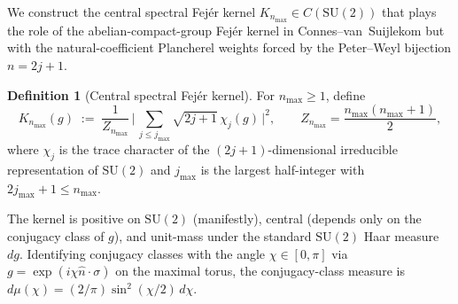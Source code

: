 \documentclass[11pt,a4paper]{article}
\theoremstyle{plain}
\theoremstyle{definition}
\newtheorem{definition}[theorem]{Definition}
\newcommand{\nmax}{n_{\max}}
\newcommand{\SU}{\mathrm{SU}}
\newcommand{\KS}{K}
\begin{document}
We construct the central spectral Fej\'er kernel
$\KS_{\nmax} \in C(\SU(2))$ that plays the role of the
abelian-compact-group Fej\'er kernel in Connes--van~Suijlekom
\cite[\S 3]{connes_vs2021} but with the natural-coefficient Plancherel
weights forced by the Peter--Weyl bijection $n = 2j + 1$.

\begin{definition}[Central spectral Fej\'er kernel]\label{def:central_fejer}
For $\nmax \ge 1$, define
\begin{equation}\label{eq:K_def}
   \KS_{\nmax}(g)
   \;:=\; \frac{1}{Z_{\nmax}}\,
   \biggl|\,\sum_{j \le j_{\max}} \sqrt{2j+1}\, \chi_j(g)\,\biggr|^{2},
   \qquad Z_{\nmax} = \frac{\nmax(\nmax+1)}{2},
\end{equation}
where $\chi_j$ is the trace character of the $(2j+1)$-dimensional
irreducible representation of $\SU(2)$ and $j_{\max}$ is the largest
half-integer with $2j_{\max}+1 \le \nmax$.
\end{definition}

The kernel is positive on $\SU(2)$ (manifestly), central (depends only
on the conjugacy class of $g$), and unit-mass under the standard
$\SU(2)$ Haar measure $dg$. Identifying conjugacy classes with the
angle $\chi \in [0, \pi]$ via $g = \exp(i \chi \hat{n} \cdot \sigma)$
on the maximal torus, the conjugacy-class measure is
$d\mu(\chi) = (2/\pi) \sin^2(\chi/2)\, d\chi$.
\end{document}
